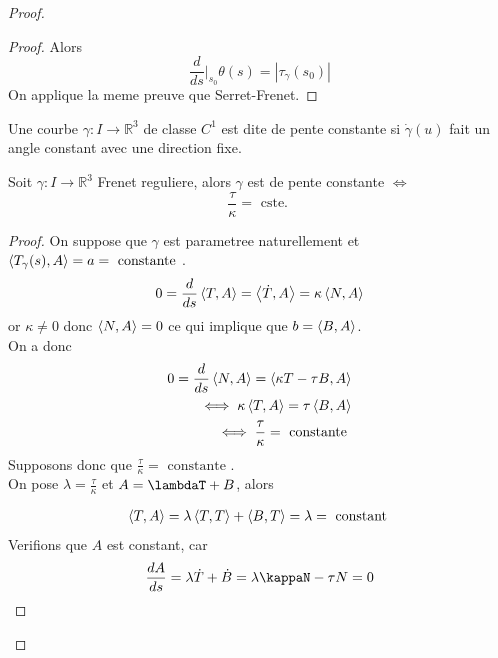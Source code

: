 \documentclass[../main.tex]{subfiles}
\begin{document}
\begin{proof}
\begin{propo}
\end{propo}
\begin{proof}
Alors
\[ 
	\frac{d}{ds}\vert_{s_0} \theta( s) = | \tau_{\gamma} ( s_0) |
\]
On applique la meme preuve que Serret-Frenet.

\end{proof}
\begin{defn}
	Une courbe $\gamma:I\to \mathbb{R}^{3}$ de classe $C^{1}$ est dite de pente constante si $\dot{\gamma}( u) $ fait un angle constant avec une direction fixe.
\end{defn}
\begin{propo}
Soit $\gamma:I\to \mathbb{R}^{3}$ Frenet reguliere, alors $\gamma$ est de pente constante $\iff$ 
\[ 
\frac{\tau}{\kappa}= \text{ cste. } 
\]

\end{propo}
\begin{proof}
	On suppose que $\gamma$ est parametree naturellement et $\left\langle T_{\gamma} ( s) , A\right\rangle =a = \text{ constante } $.\\
	\[ 
0 = \frac{d}{ds} \left\langle T,A\right\rangle = \left\langle \dot T, A\right\rangle = \kappa \left\langle N,A\right\rangle 	
	\]
	or $\kappa\neq 0$ donc $\left\langle N,A\right\rangle = 0$ ce qui implique que $b= \left\langle B,A\right\rangle $.\\
	On a donc
	\begin{align*}
	0 = \frac{d}{ds} \left\langle N,A\right\rangle = \left\langle \kappa T- \tau B, A\right\rangle \\
	\iff \kappa \left\langle T,A\right\rangle = \tau \left\langle B,A\right\rangle \\
	\iff \frac{\tau}{\kappa}= \text{ constante } 	
	\end{align*}
Supposons donc que $\frac{\tau}{\kappa}= \text{ constante } $.\\
On pose $\lambda = \frac{\tau}{\kappa}$ et $A= \lambdaT + B$, alors

\begin{align*}
	\left\langle T,A\right\rangle = \lambda \left\langle T,T\right\rangle + \left\langle B,T\right\rangle = \lambda = \text{ constant } 
\end{align*}
Verifions que $A$ est constant, car
\[ 
\frac{dA}{ds}= \lambda \dot T + \dot B = \lambda \kappaN - \tau N = 0
\]
\end{proof}

\end{proof}
\end{document}
